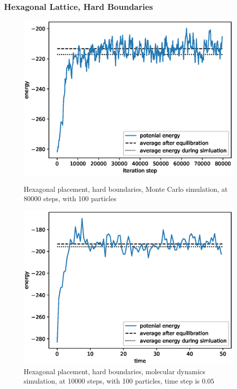 \documentclass[UTF8,a4paper,no-math]{article}
\begin{document}
\subsubsection{Hexagonal Lattice, Hard Boundaries}
\begin{figure}[H]
	\centering
	\begin{minipage}[t]{0.45\textwidth}
		\centering
		\includegraphics[height=0.2\textheight]{fig/plot_hb_norand_80000_steps_100_particles_0.8442_rho_0.728_tempure_1.eps}
		\caption{Hexagonal placement, hard boundaries, Monte Carlo simulation, at 80000 steps, with 100 particles}
	\end{minipage}\hspace{0.5cm}
	\begin{minipage}[t]{0.45\textwidth}
		\centering
		\includegraphics[height=0.2\textheight]{fig/md_plot_norand_hard_10000_steps_100_particles_0.8442_rho_0.728_tempure_.eps}
		\caption{Hexagonal placement, hard boundaries, molecular dynamics simulation, at 10000 steps, with 100 particles, time step is $0.05$}
	\end{minipage}
\end{figure}
\end{document}
